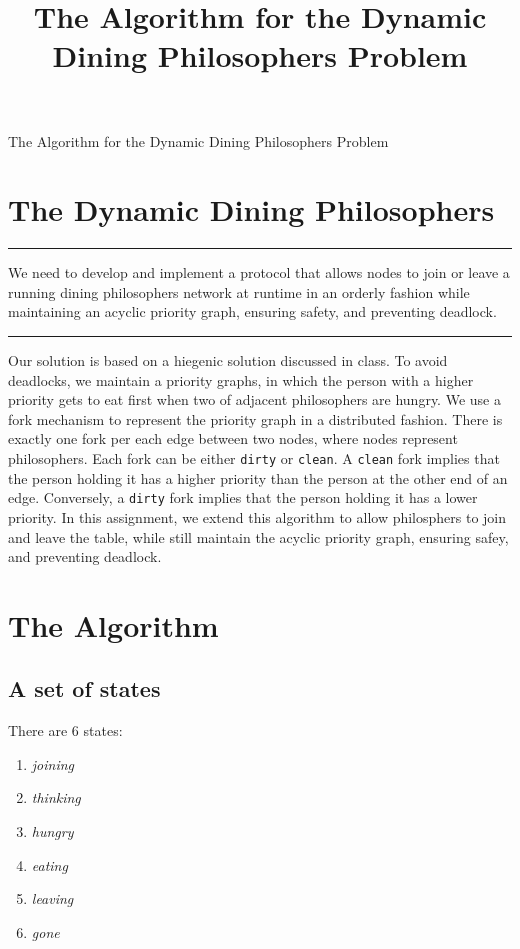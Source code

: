 \documentclass[11pt]{article}
\title{The Algorithm for the Dynamic Dining Philosophers Problem}
\newenvironment{problem}[1]{
\medskip \hrule \medskip
\noindent {\bf Problem #1.}
}{
\medskip \hrule \medskip
}
\begin{document}
\pagestyle{fancy}


\vspace*{0.1in}
\begin{center} \Large The Algorithm for the Dynamic Dining Philosophers Problem \end{center}

\section{The Dynamic Dining Philosophers}
\begin{problem}{Statement}
We need to develop and implement a protocol that allows nodes to join or leave a running dining philosophers network at runtime in an orderly fashion while maintaining an acyclic priority graph, ensuring safety, and preventing deadlock.
\end{problem}

Our solution is based on a hiegenic solution discussed in class. To avoid deadlocks, we maintain a priority graphs, in which the person with a higher priority gets to eat first when two of adjacent philosophers are hungry. We use a fork mechanism to represent the priority graph in a distributed fashion. There is exactly one fork per each edge between two nodes, where nodes represent philosophers. Each fork can be either \texttt{dirty} or \texttt{clean}. A \texttt{clean} fork implies that the person holding it has a higher priority than the person at the other end of an edge. Conversely, a \texttt{dirty} fork implies that the person holding it has a lower priority. In this assignment, we extend this algorithm to allow philosphers to join and leave the table, while still maintain the acyclic priority graph, ensuring safey, and preventing deadlock.


\section{The Algorithm}
\subsection{A set of states}
There are 6 states:
\begin{enumerate}
\item \textit{joining}
\item \textit{thinking}
\item \textit{hungry}
\item \textit{eating}
\item \textit{leaving}
\item \textit{gone}
\end{enumerate}
\end{document}

